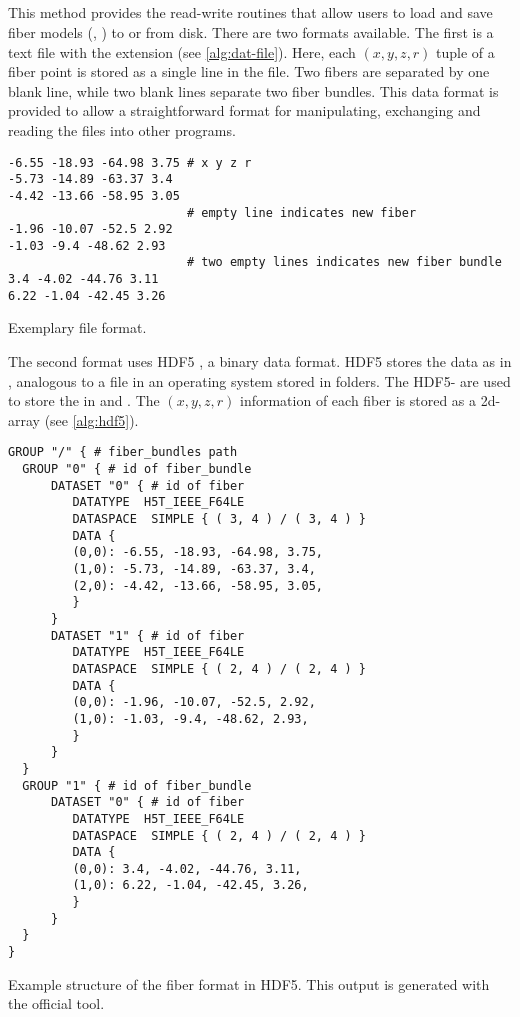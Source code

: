 \subsection{}
%
This method provides the read-write routines that allow users to load and save fiber models (\ie{}, ) to or from disk.
There are two formats available.
The first is a text file with the extension  (see \cref{alg:dat-file}).
Here, each $(x,y,z,r)$ tuple of a fiber point is stored as a single line in the file.
Two fibers are separated by one blank line, while two blank lines separate two fiber bundles.
This data format is provided to allow a straightforward format for manipulating, exchanging and reading the files into other programs.
\par
%
\begin{lstfloat}[!ht]
\begin{lstlisting}
-6.55 -18.93 -64.98 3.75 # x y z r
-5.73 -14.89 -63.37 3.4
-4.42 -13.66 -58.95 3.05
                         # empty line indicates new fiber
-1.96 -10.07 -52.5 2.92
-1.03 -9.4 -48.62 2.93
                         # two empty lines indicates new fiber bundle
3.4 -4.02 -44.76 3.11
6.22 -1.04 -42.45 3.26
\end{lstlisting}
\caption[]{Exemplary  file format.}\label{alg:dat-file}
\end{lstfloat}
%
The second format uses \ac{HDF5} \cite{hdf5}, a binary data format.
\ac{HDF5} stores the data as  in , analogous to a file in an operating system stored in folders.
The \ac{HDF5}- are used to store the  in  and .
The $(x,y,z,r)$ information of each fiber is stored as a 2d-array (see \cref{alg:hdf5}).
%
\begin{lstfloat}[!ht]
\begin{lstlisting}
GROUP "/" { # fiber_bundles path
  GROUP "0" { # id of fiber_bundle
      DATASET "0" { # id of fiber
         DATATYPE  H5T_IEEE_F64LE
         DATASPACE  SIMPLE { ( 3, 4 ) / ( 3, 4 ) }
         DATA {
         (0,0): -6.55, -18.93, -64.98, 3.75,
         (1,0): -5.73, -14.89, -63.37, 3.4,
         (2,0): -4.42, -13.66, -58.95, 3.05,
         }
      }
      DATASET "1" { # id of fiber
         DATATYPE  H5T_IEEE_F64LE
         DATASPACE  SIMPLE { ( 2, 4 ) / ( 2, 4 ) }
         DATA {
         (0,0): -1.96, -10.07, -52.5, 2.92,
         (1,0): -1.03, -9.4, -48.62, 2.93,
         }
      }
  }
  GROUP "1" { # id of fiber_bundle
      DATASET "0" { # id of fiber
         DATATYPE  H5T_IEEE_F64LE
         DATASPACE  SIMPLE { ( 2, 4 ) / ( 2, 4 ) }
         DATA {
         (0,0): 3.4, -4.02, -44.76, 3.11,
         (1,0): 6.22, -1.04, -42.45, 3.26,
         }
      }
  }
}
\end{lstlisting}
\caption[]{Example structure of the fiber format in \ac{HDF5}. This output is generated with the official  tool.}
\label{alg:hdf5}
\end{lstfloat}
%
%
%
